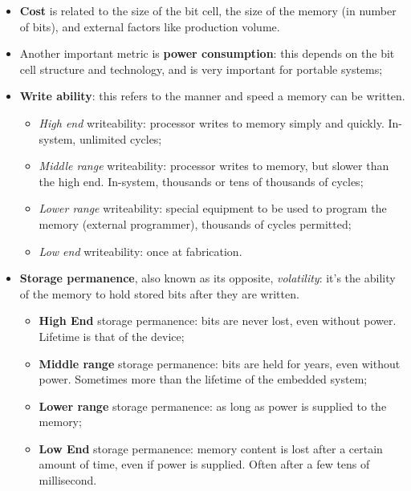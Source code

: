 \documentclass[a4paper,11pt]{article}
\begin{document}
\begin{itemize}
	      In fact, memories (especially DRAMs) are at the cutting edge of technology: they are the first components to adopt smaller gate lengths;

	\item \textbf{Cost} is related to the size of the bit cell, the size of the memory (in number of bits), and external factors like production volume.

	\item Another important metric is \textbf{power consumption}: this depends on the bit cell structure and technology, and is very important for portable systems;

	\item \textbf{Write ability}: this refers to the manner and speed a memory can be written.

	      \begin{itemize}
		      \item \textit{High end} writeability: processor writes to memory simply and quickly. In-system, unlimited cycles;
		      \item \textit{Middle range} writeability: processor writes to memory, but slower than the high end. In-system, thousands or tens of thousands of cycles;
		      \item \textit{Lower range} writeability: special equipment to be used to program the memory (external programmer), thousands of cycles permitted;
		      \item \textit{Low end} writeability: once at fabrication.
	      \end{itemize}

	\item \textbf{Storage permanence}, also known as its opposite, \textit{volatility}: it's the ability of the memory to hold stored bits after they are written.

	      \begin{itemize}
		      \item \textbf{High End} storage permanence: bits are never lost, even without power. Lifetime is that of the device;
		      \item \textbf{Middle range} storage permanence: bits are held for years, even without power. Sometimes more than the lifetime of the embedded system;
		      \item \textbf{Lower range} storage permanence: as long as power is supplied to the memory;
		      \item \textbf{Low End} storage permanence: memory content is lost after a certain amount of time, even if power is supplied. Often after a few tens of millisecond.
	      \end{itemize}
\end{itemize}
\end{document}

